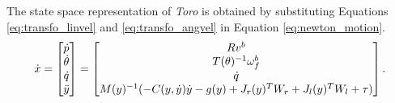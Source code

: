  The state space representation of \emph{Toro} is obtained by substituting Equations \ref{eq:transfo_linvel} and \ref{eq:transfo_angvel} in Equation \ref{eq:newton_motion}.
\begin{equation}
\label{eq:toro}
	\dot{x} = 
	\begin{bmatrix}
	\dot{p} \\ \dot{\theta} \\ \dot{q} \\ \ddot{y}
	\end{bmatrix}
	=
	\begin{bmatrix}
	R v^b\\	
	T(\theta)^{-1} \omega_f^b \\
	\dot{q}\\
	M(y)^{-1}(-C(y,\dot{y})\dot{y} -g(y) +  J_r(y)^{T}W_{r} +J_l(y)^{T}W_{l} + \tau)
	\end{bmatrix}.
	\\
\end{equation}	

